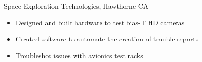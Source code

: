 \documentclass[line,mmmargin]{res}
\begin{document}
\begin{resume}
	Space Exploration Technologies, Hawthorne CA
	\begin{itemize}  \itemsep -2pt %
		\item Designed and built hardware to test bias-T HD cameras
		\item Created software to automate the creation of trouble reports
		\item Troubleshot issues with avionics test racks
	\end{itemize}
 




\end{resume}
\end{document}
